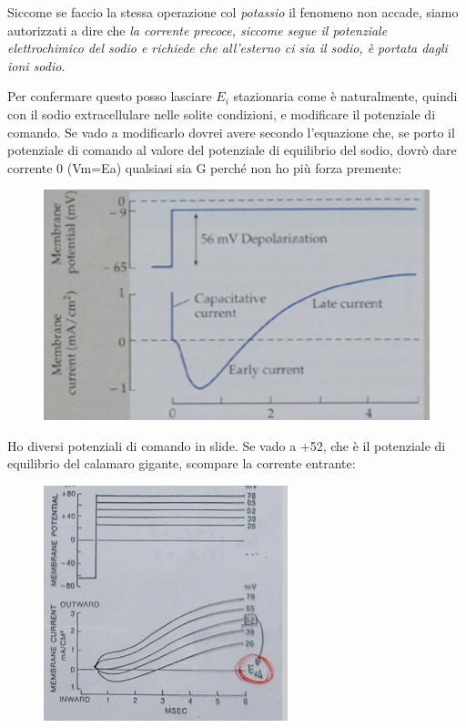 \documentclass[a4paper,12pt]{article}
\begin{document}
Siccome se faccio la stessa operazione col \emph{potassio} il fenomeno non accade, siamo autorizzati a dire che \emph{la corrente precoce, siccome segue il potenziale elettrochimico del sodio e richiede che all’esterno ci sia il sodio, è portata dagli ioni sodio}.

Per confermare questo posso lasciare $E_{i}$ stazionaria come è naturalmente, quindi con il sodio extracellulare nelle solite condizioni, e modificare il potenziale di comando. Se vado a modificarlo dovrei avere secondo l’equazione che, se porto il potenziale di comando al valore del potenziale di equilibrio del sodio, dovrò dare corrente 0 (Vm=Ea) qualsiasi sia G perché non ho più forza premente:

\begin{figure}[H]
\centering
\includegraphics[scale=0.5]{immagine/potassio.jpg}
\end{figure}

Ho diversi potenziali di comando in slide. Se vado a +52, che è il potenziale di equilibrio del calamaro gigante, scompare la corrente entrante:

\begin{figure}[H]
\centering
\includegraphics[scale=0.5]{immagine/52.jpg}
\end{figure}
 
\end{document}
